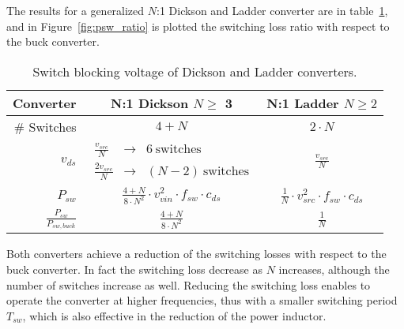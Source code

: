 The results for a generalized $N$:1 Dickson and Ladder converter are in table~\ref{tab:Dick_Ladder_v_blk}, and in Figure~\ref{fig:psw_ratio} is plotted the switching loss ratio with respect to the buck converter.
\begin{table}[h]
\centering
\caption{Switch blocking voltage of Dickson and Ladder converters.}
\label{tab:Dick_Ladder_v_blk}
\renewcommand{\arraystretch}{1.5}%
\begin{tabular}{r | c  c   }
 Converter &  N:1 Dickson  $ N \geq$ 3  &  N:1 Ladder $ N \geq 2$  \\
 \midrule
\# Switches & $ 4 + N $  & $2 \cdot N$ \\
 $v_{ds}$ & $\begin{array} {rcl} \frac{v_{src}}{N}   & \to &  6~ \text{switches} \\
                                           \frac{2 v_{src}}{N} & \to &  (N - 2) ~\text{switches}
                       \end{array}$
                       &   $ \frac{v_{src}}{N} $ \\
 $ P_{sw}$ &  $ \frac{4+N}{8 \cdot N^2} \cdot v_{vin}^2 \cdot f_{sw}  \cdot {c_{ds}} $ &  $ \frac{1}{ N} \cdot v_{src}^2 \cdot f_{sw} \cdot {c_{ds}} $  \\
 $ \frac{P_{sw}}{P_{sw,buck}}$ &  $ \frac{4+N}{8 \cdot N^2}  $ &  $ \frac{1}{ N}  $  \\


 \end{tabular}
\end{table}

Both converters achieve a reduction of the switching losses with respect to the buck converter. In fact the switching loss decrease as $N$ increases, although the number of switches increase as well. Reducing the switching loss enables to operate the converter at higher frequencies, thus with a smaller switching period $T_{sw}$, which is also effective in the reduction of the power inductor.

\begin{SCfigure}
\centering
{}
\caption{Switching loss ratio for Dickson and Ladder converters with respect to buck converter.}
\label{fig:psw_ratio}
\end{SCfigure}

